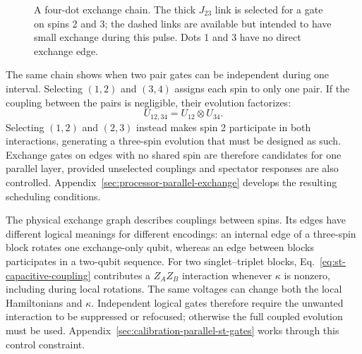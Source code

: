 \begin{figure}[htbp]
 \centering
 \caption{A four-dot exchange chain. The thick \(J_{23}\) link
 is selected for a gate on spins 2 and 3; the dashed links are
 available but intended to have small exchange during this pulse.
 Dots 1 and 3 have no direct exchange edge.}
 \label{fig:processor-four-dot-exchange}
 \label{fig:platform-exchange-selection}
\end{figure}
\FloatBarrier

The same chain shows when two pair gates can be independent during
one interval. Selecting $(1,2)$ and $(3,4)$ assigns each spin to
only one pair. If the coupling between the pairs is negligible,
their evolution factorizes:
\begin{equation}
 U_{12,34}=U_{12}\otimes U_{34}.
 \label{eq:platform-parallel-exchange}
\end{equation}
Selecting $(1,2)$ and $(2,3)$ instead makes spin 2 participate in
both interactions, generating a three-spin evolution that must be
designed as such. Exchange gates on edges with no shared spin are
therefore candidates for one parallel layer, provided unselected
couplings and spectator responses are also controlled.
Appendix~\ref{sec:processor-parallel-exchange} develops the resulting
scheduling conditions.

The physical exchange graph describes couplings between spins.
Its edges have different logical meanings for different encodings:
an internal edge of a three-spin block rotates one exchange-only
qubit, whereas an edge between blocks participates in a two-qubit
sequence. For two singlet--triplet blocks,
Eq.~\eqref{eq:st-capacitive-coupling} contributes a $Z_AZ_B$
interaction whenever $\kappa$ is nonzero, including during local
rotations. The same voltages can change both the local Hamiltonians
and $\kappa$. Independent logical gates therefore require the
unwanted interaction to be suppressed or refocused; otherwise the
full coupled evolution must be used. Appendix~\ref{sec:calibration-parallel-st-gates}
works through this control constraint.


